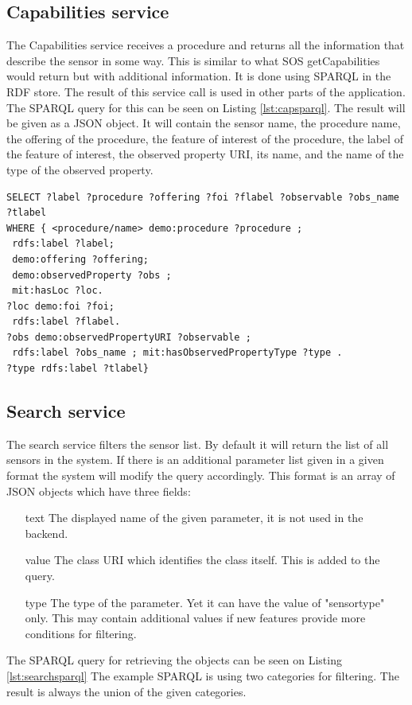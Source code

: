 \subsection{Capabilities service}
The Capabilities service receives a procedure and returns all the information that describe the sensor in some way. This is similar to what SOS getCapabilities would return but with additional information. It is done using SPARQL in the RDF store. The result of this service call is used in other parts of the application. The SPARQL query for this can be seen on Listing \ref{lst:capsparql}. The result will be given as a JSON object. It will contain the sensor name, the procedure name, the offering of the procedure, the feature of interest of the procedure, the label of the feature of interest, the observed property URI, its name, and the name of the type of the observed property. 


\begin{lstlisting}[caption={SPARQL query for Capabilities\label{lst:capsparql}}]
SELECT ?label ?procedure ?offering ?foi ?flabel ?observable ?obs_name ?tlabel 
WHERE { <procedure/name> demo:procedure ?procedure ;
 rdfs:label ?label;
 demo:offering ?offering;
 demo:observedProperty ?obs ; 
 mit:hasLoc ?loc.
?loc demo:foi ?foi;
 rdfs:label ?flabel. 
?obs demo:observedPropertyURI ?observable ;
 rdfs:label ?obs_name ; mit:hasObservedPropertyType ?type .
?type rdfs:label ?tlabel}
\end{lstlisting}

\subsection{Search service}
The search service filters the sensor list. By default it will return the list of all sensors in the system. If there is an additional parameter list given in a given format the system will modify the query accordingly. This format is an array of  JSON objects which have three fields: 
\begin{itemize}
\item[text] The displayed name of the given parameter, it is not used in the backend.
\item[value] The class URI which identifies the class itself. This is added to the query.
\item[type] The type of the parameter. Yet it can have the value of "sensortype" only. This may contain additional values if new features provide more conditions for filtering. 
\end{itemize}
The SPARQL query for retrieving the objects can be seen on Listing \ref{lst:searchsparql} The example SPARQL is using two categories for filtering. The result is always the union of the given categories. 

